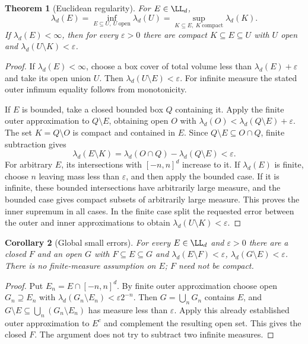 \documentclass[11pt,oneside,openany]{book}
\newtheorem{theorem}{Theorem}[chapter]
\newtheorem{corollary}[theorem]{Corollary}
\theoremstyle{definition}
\theoremstyle{remark}
\newcommand{\eps}{\varepsilon}\newcommand{\ee}{\varepsilon}
\newcommand{\family}[1]{}
\begin{document}
\begin{theorem}[Euclidean regularity]
\family{D11.03.euclidean_regularity}\label{d11:03:euclidean-regularity}
For $E\in\LL_d$,
\[
 \lambda_d(E)=\inf_{E\subseteq U,\ U\ \text{open}}\lambda_d(U)
            =\sup_{K\subseteq E,\ K\ \text{compact}}\lambda_d(K).
\]
If $\lambda_d(E)<\infty$, then for every $\eps>0$ there are compact
$K\subseteq E\subseteq U$ with $U$ open and $\lambda_d(U\setminus K)<\eps$.
\end{theorem}
\begin{proof}
If $\lambda_d(E)<\infty$, choose a box cover of total volume less than
$\lambda_d(E)+\eps$ and take its open union $U$. Then
$\lambda_d(U\setminus E)<\eps$. For infinite measure the stated outer
infimum equality follows from monotonicity.

If $E$ is bounded, take a closed bounded box $Q$ containing it. Apply the
finite outer approximation to $Q\setminus E$, obtaining open $O$ with
$\lambda_d(O)<\lambda_d(Q\setminus E)+\eps$. The set $K=Q\setminus O$
is compact and contained in $E$. Since $Q\setminus E\subseteq O\cap Q$,
finite subtraction gives
\[
 \lambda_d(E\setminus K)
 =\lambda_d(O\cap Q)-\lambda_d(Q\setminus E)<\eps.
\]
For arbitrary $E$, its intersections with $[-n,n]^d$ increase to it.
If $\lambda_d(E)$ is finite, choose $n$ leaving mass less than $\eps$,
and then apply the bounded case. If it is infinite, these bounded
intersections have arbitrarily large measure, and the bounded case gives
compact subsets of arbitrarily large measure. This proves the inner supremum
in all cases. In the finite case split the requested error between the outer
and inner approximations to obtain $\lambda_d(U\setminus K)<\eps$.
\end{proof}

\begin{corollary}[Global small errors]
\family{D11.03.global_closed_open_approximation}\label{d11:03:global-closed-open-approximation}
For every $E\in\LL_d$ and $\eps>0$ there are a closed $F$ and an open $G$
with $F\subseteq E\subseteq G$ and
$\lambda_d(E\setminus F)<\eps$, $\lambda_d(G\setminus E)<\eps$.
There is no finite-measure assumption on $E$; $F$ need not be compact.
\end{corollary}
\begin{proof}
Put $E_n=E\cap[-n,n]^d$. By finite outer approximation choose open
$G_n\supseteq E_n$ with $\lambda_d(G_n\setminus E_n)<\eps2^{-n}$.
Then $G=\bigcup_nG_n$ contains $E$, and
$G\setminus E\subseteq\bigcup_n(G_n\setminus E_n)$ has measure less than
$\eps$. Apply this already established outer approximation to $E^c$ and
complement the resulting open set. This gives the closed $F$. The argument
does not try to subtract two infinite measures.
\end{proof}
\end{document}
